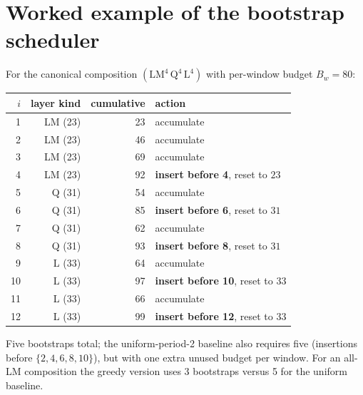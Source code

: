 \documentclass[11pt,a4paper]{article}
\begin{document}
\section{Worked example of the bootstrap scheduler}

For the canonical composition $(\text{LM}^4 \, \text{Q}^4 \, \text{L}^4)$
with per-window budget $B_w = 80$:

\begin{center}
\begin{tabular}{r r r l}
\toprule
$i$ & layer kind & cumulative & action \\
\midrule
1 & LM (23) & 23  & accumulate \\
2 & LM (23) & 46  & accumulate \\
3 & LM (23) & 69  & accumulate \\
4 & LM (23) & 92  & \textbf{insert before 4}, reset to $23$ \\
5 & Q (31)  & 54  & accumulate \\
6 & Q (31)  & 85  & \textbf{insert before 6}, reset to $31$ \\
7 & Q (31)  & 62  & accumulate \\
8 & Q (31)  & 93  & \textbf{insert before 8}, reset to $31$ \\
9 & L (33)  & 64  & accumulate \\
10 & L (33) & 97  & \textbf{insert before 10}, reset to $33$ \\
11 & L (33) & 66  & accumulate \\
12 & L (33) & 99  & \textbf{insert before 12}, reset to $33$ \\
\bottomrule
\end{tabular}
\end{center}

Five bootstraps total; the uniform-period-2 baseline also requires
five (insertions before $\{2,4,6,8,10\}$), but with one extra unused
budget per window. For an all-LM composition the greedy version uses
3 bootstraps versus 5 for the uniform baseline.
\end{document}

